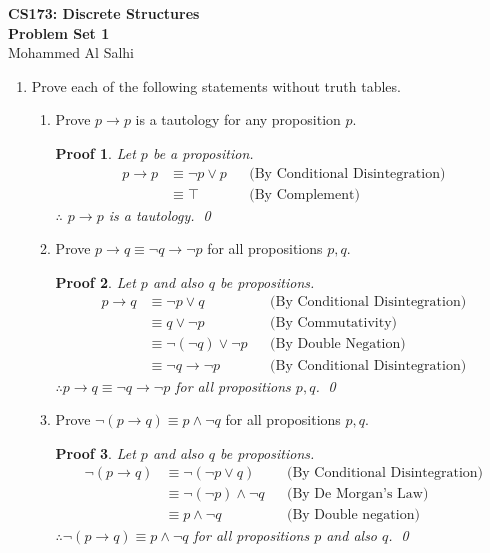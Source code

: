 \documentclass[12pt]{article}
\newcommand{\T}{\top}
\theoremstyle{proofstyle}
\newtheorem*{proof*}{Proof}
\renewcommand{\maketitle}{%
  \begin{flushleft}
    {\Large\bfseries CS173: Discrete Structures}\\[0.3em]
    {\Large\bfseries Problem Set 1}\\[0.5em]
    {\normalsize Mohammed Al Salhi}
  \end{flushleft}
  \vspace{1em}
}
\begin{document}
\maketitle

\begin{enumerate}[left=0pt, itemsep=2em, parsep=1em]

\item Prove each of the following statements without truth tables.

\begin{enumerate}[label=(\alph*), itemsep=1.5em, leftmargin=2em]

\item Prove $p \to p$ is a tautology for any proposition $p$.

\begin{proof*}
Let $p$ be a proposition.
\begin{align*}
p \to p &\equiv \neg p \vee p && \text{(By Conditional Disintegration)} \\
&\equiv \T && \text{(By Complement)}
\end{align*}
$\therefore$ $p \to p$ is a tautology. \qed
\end{proof*}

\item Prove $p \to q \equiv \neg q \to \neg p$ for all propositions $p, q$.

\begin{proof*}
Let $p$ and also $q$ be propositions.
\begin{align*}
p \to q &\equiv \neg p \vee q && \text{(By Conditional Disintegration)} \\
&\equiv q \vee \neg p && \text{(By Commutativity)} \\
&\equiv \neg (\neg q ) \vee \neg p && \text{(By Double Negation)} \\
&\equiv \neg q \to \neg p && \text{(By Conditional Disintegration)}
\end{align*}
$\therefore p \to q \equiv \neg q \to \neg p$ for all propositions $p, q$. \qed
\end{proof*}

\item Prove $\neg(p \to q) \equiv p \wedge \neg q$ for all propositions $p, q$.

\begin{proof*}
Let $p$ and also $q$ be propositions.
\begin{align*}
\neg(p \to q) &\equiv \neg(\neg p \vee q) && \text{(By Conditional Disintegration)} \\
&\equiv \neg(\neg p) \wedge \neg q && \text{(By De Morgan's Law)} \\
&\equiv p \wedge \neg q && \text{(By Double negation)}
\end{align*}
$\therefore \neg(p \to q) \equiv p \wedge \neg q$ for all propositions $p$ and also $q$. \qed
\end{proof*}


\end{enumerate}
\end{enumerate}
\end{document}
